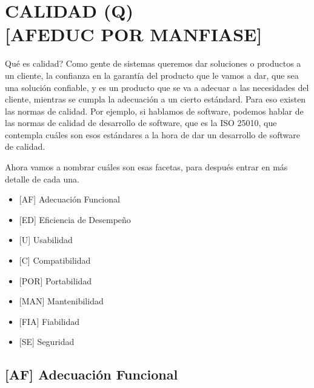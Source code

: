 
\twocolumn
\hypertarget{calidad-q}{%
\section{CALIDAD (Q) \\ {[}AFEDUC POR MANFIASE{]}}\label{calidad-q}}



Qué es calidad? Como gente de sistemas queremos dar soluciones o
productos a un cliente, la confianza en la garantía del producto que le
vamos a dar, que sea una solución confiable, y es un producto que se va
a adecuar a las necesidades del cliente, mientras se cumpla la
adecuación a un cierto estándard. Para eso existen las normas de
calidad. Por ejemplo, si hablamos de software, podemos hablar de las
normas de calidad de desarrollo de software, que es la ISO 25010, que
contempla cuáles son esos estándares a la hora de dar un desarrollo de
software de calidad.

Ahora vamos a nombrar cuáles son esas facetas, para después entrar en
más detalle de cada una.

\begin{itemize}
  \setlength\itemsep{-1em}
\item
  {[}AF{]}
  Adecuación Funcional
\item
  {[}ED{]}
  Eficiencia de Desempeño
\item
  {[}U{]}
  Usabilidad
\item
  {[}C{]}
  Compatibilidad
\item
  {[}POR{]}
  Portabilidad
\item
  {[}MAN{]}
  Mantenibilidad
\item
  {[}FIA{]}
  Fiabilidad
\item
  {[}SE{]}
  Seguridad
\end{itemize}


\hypertarget{adecuaciuxf3n-funcional-af}{%
\subsection{%
{[}AF{]}
Adecuación Funcional
}\label{adecuaciuxf3n-funcional-af}}

